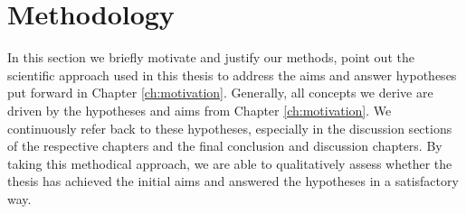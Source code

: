 \chapter{Methodology}
\label{ch:methodology}





In this section we briefly motivate and justify our methods, point out the scientific approach used in this thesis to address the aims and answer hypotheses put forward in Chapter \ref{ch:motivation}. Generally, all concepts we derive are driven by the hypotheses and aims from Chapter \ref{ch:motivation}. We continuously refer back to these hypotheses, especially in the discussion sections of the respective chapters and the final conclusion and discussion chapters. By taking this methodical approach, we are able to qualitatively assess whether the thesis has achieved the initial aims and answered the hypotheses in a satisfactory way.

